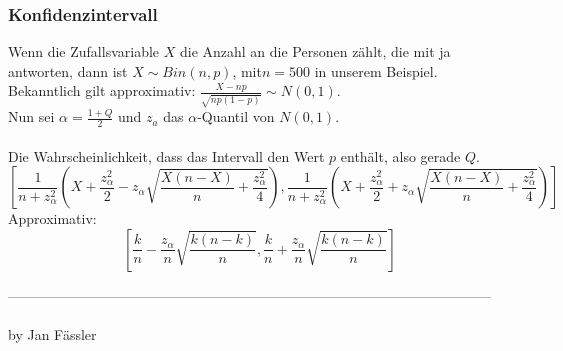 \documentclass[landscape,twocolumn,a4paper]{article}
\begin{document}
\subsubsection*{Konfidenzintervall}
Wenn die Zufallsvariable $X$ die Anzahl an die Personen zählt, die mit ja antworten, dann ist $X \sim Bin(n,p)$, mit$n=500$ in unserem Beispiel. \\
Bekanntlich gilt approximativ: $\frac{X-np}{\sqrt{np(1-p)}} \sim N(0,1)$.\\
Nun sei $\alpha=\frac{1+Q}{2}$ und $z_a$ das $\alpha$-Quantil von $N(0,1)$.\\
\\
Die Wahrscheinlichkeit, dass das Intervall den Wert $p$ enthält, also gerade $Q$.
\begin{equation*}
\left[\frac{1}{n+z_\alpha^2} \left(X+\frac{z_\alpha^2}{2}-z_\alpha\sqrt{\frac{X(n-X)}{n}+\frac{z_\alpha^2}{4}}\right), \frac{1}{n+z_\alpha^2} \left(X+\frac{z_\alpha^2}{2}+z_\alpha\sqrt{\frac{X(n-X)}{n}+\frac{z_\alpha^2}{4}}\right)\right]
\end{equation*}
Approximativ:
\begin{equation*}
	\left[\frac{k}{n}-\frac{z_\alpha}{n}\sqrt{\frac{k(n-k)}{n}}, \frac{k}{n}+\frac{z_\alpha}{n}\sqrt{\frac{k(n-k)}{n}} \right]
\end{equation*}



--------------------------------------------------------------------------------------------------------
\\
\\
by Jan Fässler
\end{document}
